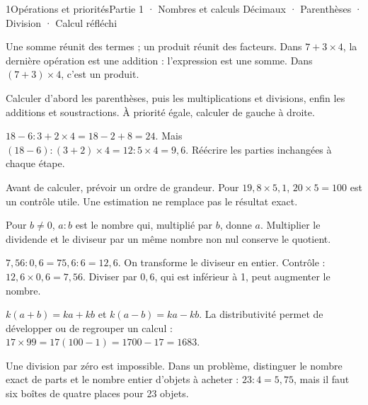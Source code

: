 \begin{ouverture}[calcul]{1}{Opérations et priorités}{Partie 1 · Nombres et calculs}
{Décimaux · Parenthèses · Division · Calcul réfléchi}
\end{ouverture}
\pagestyle{otMain}\essentiel\fontsize{11}{15}\selectfont
{}\label{cours-1-1}
\begin{definition}Une somme réunit des termes ; un produit réunit des facteurs. Dans $7+3\times4$, la dernière opération est une addition : l’expression est une somme. Dans $(7+3)\times4$, c’est un produit.\end{definition}
\begin{propriete}Calculer d’abord les parenthèses, puis les multiplications et divisions, enfin les additions et soustractions. À priorité égale, calculer de gauche à droite.\end{propriete}
\begin{exemple}$18-6:3+2\times4=18-2+8=24$. Mais $(18-6):(3+2)\times4=12:5\times4=9{,}6$. Réécrire les parties inchangées à chaque étape.\end{exemple}
\begin{savoirfaire}Avant de calculer, prévoir un ordre de grandeur. Pour $19{,}8\times5{,}1$, $20\times5=100$ est un contrôle utile. Une estimation ne remplace pas le résultat exact.\end{savoirfaire}
\clearpage
{}\label{cours-1-2}
\begin{definition}Pour $b\ne0$, $a:b$ est le nombre qui, multiplié par $b$, donne $a$. Multiplier le dividende et le diviseur par un même nombre non nul conserve le quotient.\end{definition}
\begin{exemple}$7{,}56:0{,}6=75{,}6:6=12{,}6$. On transforme le diviseur en entier. Contrôle : $12{,}6\times0{,}6=7{,}56$. Diviser par $0{,}6$, qui est inférieur à 1, peut augmenter le nombre.\end{exemple}
\begin{propriete}$k(a+b)=ka+kb$ et $k(a-b)=ka-kb$. La distributivité permet de développer ou de regrouper un calcul : $17\times99=17(100-1)=1700-17=1683$.\end{propriete}
\begin{attention}Une division par zéro est impossible. Dans un problème, distinguer le nombre exact de parts et le nombre entier d’objets à acheter : $23:4=5{,}75$, mais il faut six boîtes de quatre places pour 23 objets.\end{attention}

